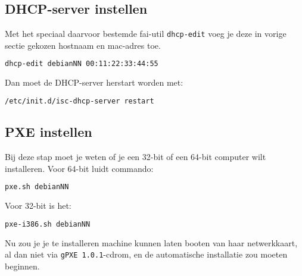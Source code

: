 \subsection{DHCP-server instellen}
Met het speciaal daarvoor bestemde fai-util \texttt{dhcp-edit} voeg je deze in vorige sectie gekozen hostnaam en mac-adres toe.
\begin{lstlisting}[language=bash]
dhcp-edit debianNN 00:11:22:33:44:55
\end{lstlisting}
Dan moet de DHCP-server herstart worden met:

\begin{lstlisting}[language=bash]
/etc/init.d/isc-dhcp-server restart
\end{lstlisting}


\subsection{PXE instellen}
Bij deze stap moet je weten of je een 32-bit of een 64-bit computer wilt installeren.
Voor 64-bit luidt commando:
\begin{lstlisting}[language=bash]
pxe.sh debianNN
\end{lstlisting}
Voor 32-bit is het:
\begin{lstlisting}[language=bash]
pxe-i386.sh debianNN
\end{lstlisting}

Nu zou je je te installeren machine kunnen laten booten van haar netwerkkaart, al dan niet via \texttt{gPXE 1.0.1}-cdrom,  en de automatische installatie zou moeten beginnen.

